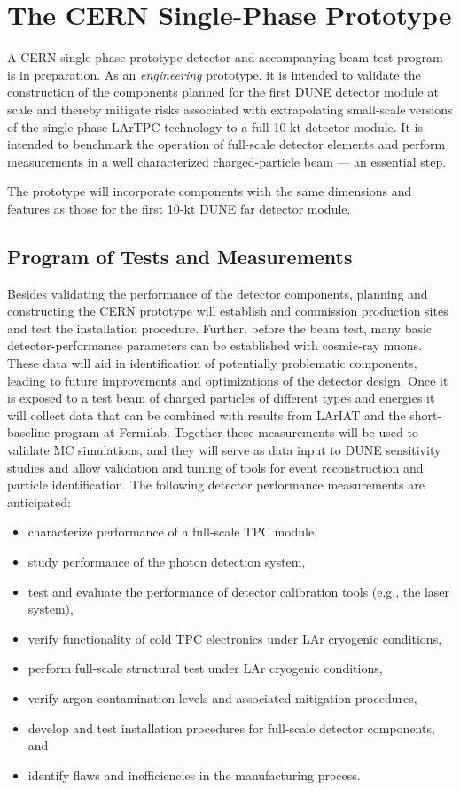 \section{The CERN Single-Phase Prototype}
\label{sec:proto-cern-single}

A CERN single-phase prototype detector and accompanying beam-test
program is in preparation. As an \textit{engineering} prototype, it is
intended to validate the construction of the components planned for the
first DUNE  detector module at scale and thereby mitigate
risks associated with extrapolating small-scale versions of the
single-phase LArTPC technology to a full 10-kt detector module.  It is
intended to benchmark the operation of full-scale detector
elements and perform measurements in a well characterized
charged-particle beam --- an essential step.

The prototype will incorporate components with the same
dimensions and features as those for the first 10-kt DUNE far detector
module.

\subsection{Program of Tests and Measurements}

Besides validating the performance of the detector components,
planning and constructing the CERN prototype will establish and
commission production sites and test the installation procedure.
Further, before the beam test, many basic detector-performance
parameters can be established with cosmic-ray muons.  These data will
aid in identification of potentially problematic components, leading
to future improvements and optimizations of the detector design.  Once
it is exposed to a test beam of charged particles of different types
and energies it will collect data that can be combined with results
from LArIAT and the short-baseline program at Fermilab.  Together
these measurements will be used to validate MC simulations, and they
will serve as data input to DUNE sensitivity studies and allow
validation and tuning of tools for event reconstruction and particle
identification.  The following detector performance measurements are
anticipated:
 \begin{itemize}
 \item characterize performance of a full-scale TPC module,
 \item study performance of the photon detection system,
 \item test and evaluate the performance of detector calibration tools (e.g., the laser system),
  \item verify functionality of cold TPC electronics under LAr cryogenic conditions,
  \item perform full-scale structural test under LAr cryogenic conditions,
  \item verify argon contamination levels and associated mitigation procedures,
  \item develop and test installation procedures for full-scale detector components, and
  \item identify flaws and inefficiencies in the manufacturing process.
\end{itemize}


